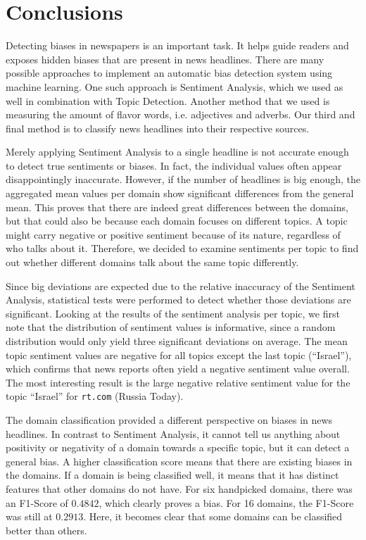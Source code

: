 \documentclass[final]{ieee}
\begin{document}
\section{Conclusions}\label{sec:conclusions}

Detecting biases in newspapers is an important task. It helps guide readers and exposes hidden biases that are present in news headlines. There are many possible approaches to implement an automatic bias detection system using machine learning. One such approach is Sentiment Analysis, which we used as well in combination with Topic Detection. Another method that we used is measuring the amount of flavor words, i.e. adjectives and adverbs. Our third and final method is to classify news headlines into their respective sources.

Merely applying Sentiment Analysis to a single headline is not accurate enough to detect true sentiments or biases. In fact, the individual values often appear disappointingly inaccurate. However, if the number of headlines is big enough, the aggregated mean values per domain show significant differences from the general mean. This proves that there are indeed great differences between the domains, but that could also be because each domain focuses on different topics. A topic might carry negative or positive sentiment because of its nature, regardless of who talks about it. Therefore, we decided to examine sentiments per topic to find out whether different domains talk about the same topic differently.

Since big deviations are expected due to the relative inaccuracy of the Sentiment Analysis, statistical tests were performed to detect whether those deviations are significant. Looking at the results of the sentiment analysis per topic, we first note that the distribution of sentiment values is informative, since a random distribution would only yield three significant deviations on average. The mean topic sentiment values are negative for all topics except the last topic (``Israel''), which confirms that news reports often yield a negative sentiment value overall. The most interesting result is the large negative relative sentiment value for the topic ``Israel'' for \texttt{rt.com} (Russia Today).


The domain classification provided a different perspective on biases in news headlines. In contrast to Sentiment Analysis, it cannot tell us anything about positivity or negativity of a domain towards a specific topic, but it can detect a general bias. A higher classification score means that there are existing biases in the domains. If a domain is being classified well, it means that it has distinct features that other domains do not have. For six handpicked domains, there was an F1-Score of $0.4842$, which clearly proves a bias. For 16 domains, the F1-Score was still at $0.2913$. Here, it becomes clear that some domains can be classified better than others.
\end{document}
